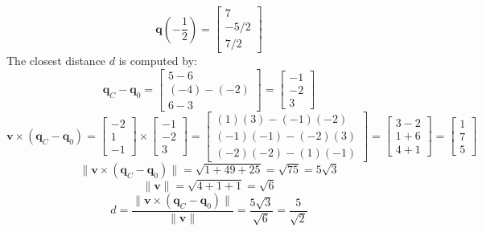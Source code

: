 \documentclass{article}
\begin{document}
\begin{itemize}
\[\mathbf{q}(-\frac{1}{2}) = \begin{bmatrix} 7 \\ -5/2 \\ 7/2 \end{bmatrix}\]
The closest distance \(d\) is computed by:
\[\mathbf{q}_C - \mathbf{q}_0 = \begin{bmatrix} 5 - 6 \\ (-4) - (-2) \\ 6 - 3 \end{bmatrix} = \begin{bmatrix} -1 \\ -2 \\ 3 \end{bmatrix}\]
\[\mathbf{v} \times (\mathbf{q}_C - \mathbf{q}_0) = \begin{bmatrix} -2 \\ 1 \\ -1 \end{bmatrix} \times \begin{bmatrix} -1 \\ -2 \\ 3 \end{bmatrix} 
= \begin{bmatrix} (1)(3) - (-1)(-2) \\ (-1)(-1) - (-2)(3) \\ (-2)(-2) - (1)(-1) \end{bmatrix} 
= \begin{bmatrix} 3 - 2 \\ 1 + 6 \\ 4 + 1 \end{bmatrix} = \begin{bmatrix} 1 \\ 7 \\ 5 \end{bmatrix}\]
\[\|\mathbf{v} \times (\mathbf{q}_C - \mathbf{q}_0)\| = \sqrt{1 + 49 + 25} = \sqrt{75} = 5\sqrt{3}\]
\[\|\mathbf{v}\| = \sqrt{4 + 1 + 1} = \sqrt{6}\]
\[d = \frac{\|\mathbf{v} \times (\mathbf{q}_C - \mathbf{q}_0)\|}{\|\mathbf{v}\|} = \frac{5\sqrt{3}}{\sqrt{6}} = \frac{5}{\sqrt{2}}\]
%

\end{itemize}
\end{document}
